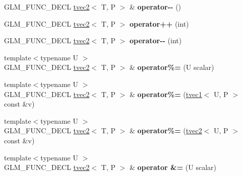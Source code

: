 \begin{DoxyCompactItemize}
G\+L\+M\+\_\+\+F\+U\+N\+C\+\_\+\+D\+E\+CL \hyperlink{structglm_1_1tvec2}{tvec2}$<$ T, P $>$ \& {\bfseries operator-\/-\/} ()
\item 
\mbox{\label{structglm_1_1tvec2_ab479786d89c64c96e9611c7c93fb29c5}} 
G\+L\+M\+\_\+\+F\+U\+N\+C\+\_\+\+D\+E\+CL \hyperlink{structglm_1_1tvec2}{tvec2}$<$ T, P $>$ {\bfseries operator++} (int)
\item 
\mbox{\label{structglm_1_1tvec2_a4206b03754b7b3ba80a3a9365755f882}} 
G\+L\+M\+\_\+\+F\+U\+N\+C\+\_\+\+D\+E\+CL \hyperlink{structglm_1_1tvec2}{tvec2}$<$ T, P $>$ {\bfseries operator-\/-\/} (int)
\item 
\mbox{\label{structglm_1_1tvec2_a274ddf6ee49b3c7f261c784b2147f6a0}} 
{\footnotesize template$<$typename U $>$ }\\G\+L\+M\+\_\+\+F\+U\+N\+C\+\_\+\+D\+E\+CL \hyperlink{structglm_1_1tvec2}{tvec2}$<$ T, P $>$ \& {\bfseries operator\%=} (U scalar)
\item 
\mbox{\label{structglm_1_1tvec2_a3750a63ccad2387d232a88a1abafa0aa}} 
{\footnotesize template$<$typename U $>$ }\\G\+L\+M\+\_\+\+F\+U\+N\+C\+\_\+\+D\+E\+CL \hyperlink{structglm_1_1tvec2}{tvec2}$<$ T, P $>$ \& {\bfseries operator\%=} (\hyperlink{structglm_1_1tvec1}{tvec1}$<$ U, P $>$ const \&v)
\item 
\mbox{\label{structglm_1_1tvec2_a3b939592b620fb6b0d7edd95c7863f0d}} 
{\footnotesize template$<$typename U $>$ }\\G\+L\+M\+\_\+\+F\+U\+N\+C\+\_\+\+D\+E\+CL \hyperlink{structglm_1_1tvec2}{tvec2}$<$ T, P $>$ \& {\bfseries operator\%=} (\hyperlink{structglm_1_1tvec2}{tvec2}$<$ U, P $>$ const \&v)
\item 
\mbox{\label{structglm_1_1tvec2_a8e4676ce30e0ff283b26794f094f3982}} 
{\footnotesize template$<$typename U $>$ }\\G\+L\+M\+\_\+\+F\+U\+N\+C\+\_\+\+D\+E\+CL \hyperlink{structglm_1_1tvec2}{tvec2}$<$ T, P $>$ \& {\bfseries operator \&=} (U scalar)
\item 
\mbox{\label{structglm_1_1tvec2_a6388e208c7c459047aed90f3b5ce31bc}} 

\end{DoxyCompactItemize}

